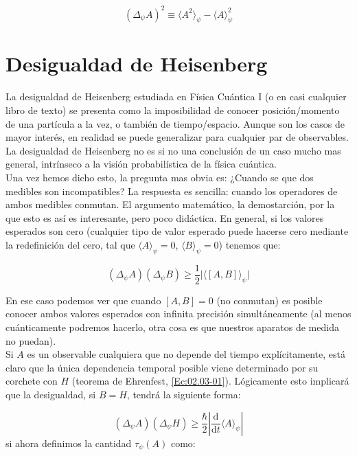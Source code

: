 \documentclass[12pt]{book}
\numberwithin{equation}{chapter}
\numberwithin{figure}{chapter}
\newcommand{\D}{\mathrm{d}}
\newcommand{\derivadas}[2]{\frac{\D #1}{\D #2}}
\begin{document}
\begin{equation}
(\Delta_\psi A)^2 \equiv \langle A^2 \rangle_\psi - \langle A \rangle^2_\psi
\end{equation}

\section{Desigualdad de Heisenberg}

La desigualdad de Heisenberg estudiada en Física Cuántica I (o en casi cualquier libro de texto) se presenta como la imposibilidad de conocer posición/momento de una partícula a la vez, o también de tiempo/espacio. Aunque son los casos de mayor interés, en realidad se puede generalizar para cualquier par de observables. La desigualdad de Heisenberg no es si no una conclusión de un caso mucho mas general, intrínseco a la visión probabilística de la física cuántica. \\

Una vez hemos dicho esto, la pregunta mas obvia es: ¿Cuando se que dos medibles son incompatibles? La respuesta es sencilla: cuando los operadores de ambos medibles conmutan. El argumento matemático, la demostarción, por la que esto es así es interesante, pero poco didáctica. En general, si los valores esperados son cero (cualquier tipo de valor esperado puede hacerse cero mediante la redefinición del cero, tal que $\langle A \rangle_\psi = 0$, $\langle B \rangle_\psi = 0$) tenemos que:

\begin{equation}
(\Delta_\psi A)( \Delta_\psi B ) \geq \frac{1}{2} \vert \langle [A,B] \rangle_\psi \vert
\end{equation}

En ese caso podemos ver que cuando $[A,B]=0$ (no conmutan) es posible conocer ambos valores esperados con infinita precisión simultáneamente (al menos cuánticamente podremos hacerlo, otra cosa es que nuestros aparatos de medida no puedan). \\

Si $A$ es un observable cualquiera que no depende del tiempo explícitamente, está claro que la única dependencia temporal posible viene determinado por su corchete con $H$ (teorema de Ehrenfest, \ref{Ec:02.03-01}). Lógicamente esto implicará que la desigualdad, si $B=H$, tendrá la siguiente forma:


\begin{equation}
(\Delta_\psi A)( \Delta_\psi H) \geq \frac{\hbar}{2} \left|  \derivadas{}{t} \langle A \rangle_\psi \right|
\end{equation}
si ahora definimos la cantidad $\tau_\psi (A)$ como:
\end{document}
